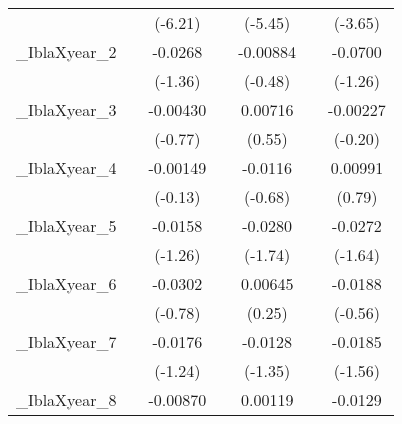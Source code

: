 {\begin{tabular}{l*{6}{c}}
            &                     &     (-6.21)         &                     &     (-5.45)         &                     &     (-3.65)         \\
[1em]
\_IblaXyear\_2&                     &     -0.0268         &                     &    -0.00884         &                     &     -0.0700         \\
            &                     &     (-1.36)         &                     &     (-0.48)         &                     &     (-1.26)         \\
[1em]
\_IblaXyear\_3&                     &    -0.00430         &                     &     0.00716         &                     &    -0.00227         \\
            &                     &     (-0.77)         &                     &      (0.55)         &                     &     (-0.20)         \\
[1em]
\_IblaXyear\_4&                     &    -0.00149         &                     &     -0.0116         &                     &     0.00991         \\
            &                     &     (-0.13)         &                     &     (-0.68)         &                     &      (0.79)         \\
[1em]
\_IblaXyear\_5&                     &     -0.0158         &                     &     -0.0280         &                     &     -0.0272         \\
            &                     &     (-1.26)         &                     &     (-1.74)         &                     &     (-1.64)         \\
[1em]
\_IblaXyear\_6&                     &     -0.0302         &                     &     0.00645         &                     &     -0.0188         \\
            &                     &     (-0.78)         &                     &      (0.25)         &                     &     (-0.56)         \\
[1em]
\_IblaXyear\_7&                     &     -0.0176         &                     &     -0.0128         &                     &     -0.0185         \\
            &                     &     (-1.24)         &                     &     (-1.35)         &                     &     (-1.56)         \\
[1em]
\_IblaXyear\_8&                     &    -0.00870         &                     &     0.00119         &                     &     -0.0129         \\

\end{tabular}}
